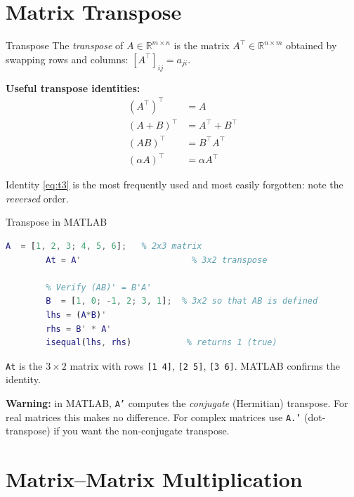 \section{Matrix Transpose}
\label{sec:app_transpose}

\begin{defnbox}{Transpose}
	The \emph{transpose} of $A \in \mathbb{R}^{m \times n}$ is the
	matrix $A^\top \in \mathbb{R}^{n \times m}$ obtained by swapping rows
	and columns: $[A^\top]_{ij} = a_{ji}$.
\end{defnbox}

\textbf{Useful transpose identities:}
\begin{align}
	(A^\top)^\top &= A \nonumber\\
	(A + B)^\top  &= A^\top + B^\top \nonumber\\
	(AB)^\top     &= B^\top A^\top \label{eq:t3}\\
	(\alpha A)^\top &= \alpha A^\top \nonumber
\end{align}

Identity \eqref{eq:t3} is the most frequently used and most easily
forgotten: note the \emph{reversed} order.

\begin{examplebox}{Transpose in MATLAB}
	\begin{lstlisting}[language=Matlab]
		A  = [1, 2, 3; 4, 5, 6];   % 2x3 matrix
		At = A'                      % 3x2 transpose
		
		% Verify (AB)' = B'A'
		B  = [1, 0; -1, 2; 3, 1];  % 3x2 so that AB is defined
		lhs = (A*B)'
		rhs = B' * A'
		isequal(lhs, rhs)           % returns 1 (true)
	\end{lstlisting}
	\solution
	\texttt{At} is the $3\times2$ matrix with rows \texttt{[1 4]},
	\texttt{[2 5]}, \texttt{[3 6]}.  MATLAB confirms the identity.
	
	\textbf{Warning:} in MATLAB, \texttt{A'} computes the
	\emph{conjugate} (Hermitian) transpose.  For real matrices this makes
	no difference.  For complex matrices use \texttt{A.'} (dot-transpose)
	if you want the non-conjugate transpose.
\end{examplebox}

\section{Matrix--Matrix Multiplication}
\label{sec:app_matmat}

